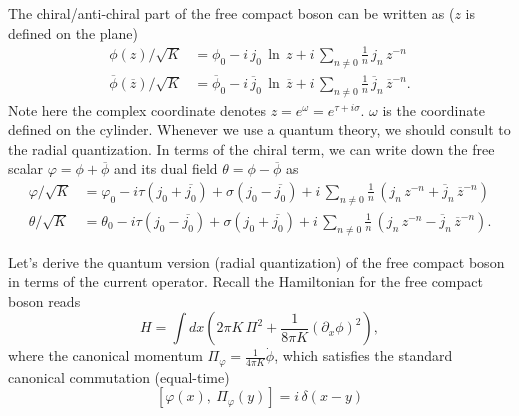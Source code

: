 The chiral/anti-chiral part of the free compact boson can be written as ($z$ is defined on the plane)
\begin{equation}
	\begin{split}
		\phi(z)/\sqrt{K} &= \phi_0 -i\,j_0\,\ln \,z + i\,\sum_{n\neq0} \frac{1}{n}\,j_n\,z^{-n} \\
		\overline{\phi}(\overline{z})/\sqrt{K} &= \overline{\phi}_0 -i\,\overline{j}_0\,\ln \, \overline{z} + i\,\sum_{n\neq0} \frac{1}{n}\,\overline{j}_n\,{\overline{z}}^{-n}.
	\end{split}
\end{equation} 
Note here the complex coordinate denotes $z = e^\omega = e^{\tau + i\sigma}$. $\omega$ is the coordinate defined on the cylinder. Whenever we use a quantum theory, we should consult to the radial quantization. In terms of the chiral term, we can write down the free scalar $\varphi = \phi + \overline{\phi}$ and its dual field $\theta = \phi - \overline{\phi}$ as
\begin{equation}
	\begin{split}
		\varphi/\sqrt{K} &= \varphi_0 -i \tau \left(j_0 + \overline{j_0}\right) + \sigma \left(j_0 - \overline{j_0}\right) + i\,\sum_{n\neq0} \frac{1}{n}\,\left( j_n\,z^{-n}+ \overline{j}_n\,{\overline{z}}^{-n}\right)\\
		\theta/\sqrt{K} &= \theta_0 -i \tau \left(j_0 - \overline{j_0}\right) + \sigma \left(j_0 + \overline{j_0}\right) + i\,\sum_{n\neq0} \frac{1}{n}\,\left( j_n\,z^{-n}- \overline{j}_n\,{\overline{z}}^{-n}\right).
	\end{split}
\end{equation}

Let's derive the quantum version (radial quantization) of the free compact boson in terms of the current operator. Recall the Hamiltonian for the free compact boson reads
\begin{equation}
	H = \int dx \left( 2\pi K\, \Pi^2 + \frac{1}{8\pi K} {\left(\partial_x \phi\right)}^2 \right),
\end{equation}
where the canonical momentum $\Pi_\varphi = \frac{1}{4\pi K} \dot{\phi}$, which satisfies the standard canonical commutation (equal-time)
\begin{equation}
	\left[\varphi(x), \ \Pi_\varphi(y) \right] = i\,\delta(x-y)
\end{equation}

